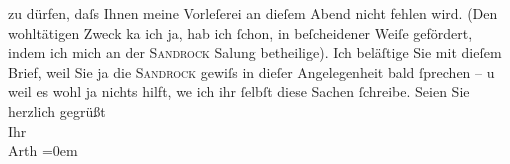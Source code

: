 \begin{ledgroupsized}[t]{13cm}
               zu dürfen, daſs Ihnen meine Vorleſerei an dieſem Abend nicht fehlen
               wird. (Den wohltätigen Zweck ka{\geminationn} ich ja, hab ich ſchon,
               in beſcheidener Weiſe gefördert, indem ich mich an der \textsc{Sandrock} Sa{\geminationm}lung betheilige{\dotstwo}).
               Ich beläſtige Sie {\pb}mit dieſem Brief, weil Sie
               ja die \textsc{Sandrock} gewiſs in dieſer Angelegenheit bald ſprechen – u weil es wohl ja nichts hilft,
                  we{\geminationn} ich ihr ſelbſt diese Sachen ſchreibe.\pend
           \pstart
           Seien Sie herzlich gegrüßt {\\[\baselineskip]}Ihr {\\[\baselineskip]}\spacefill\mbox{Arth}\pend
           \leftskip=0em{}
         
         \endnumbering{}\end{ledgroupsized}  \newcommand{\dateiname}{L02995}\newcommand{\titel}{Arthur Schnitzler an Felix Salten, 10. 1. 1905}\newcommand{\editorInnen}{Martin Anton Müller und Laura Untner}
      